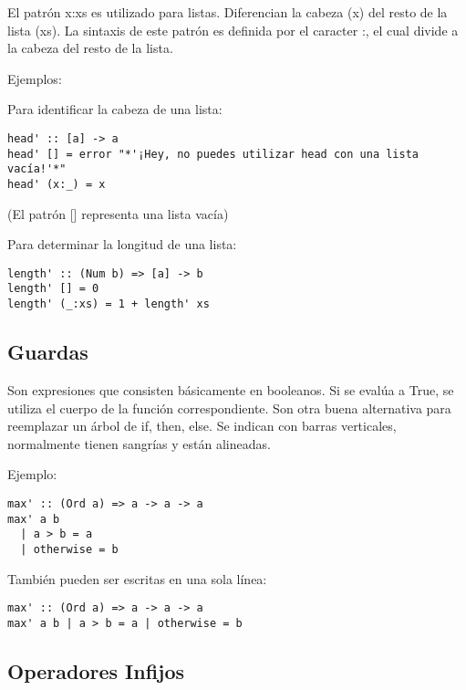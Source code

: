 El patrón x:xs es utilizado para listas. Diferencian la cabeza (x) del resto de la lista (xs). La sintaxis de este patrón es definida por el caracter :, el cual divide a la cabeza del resto de la lista.

Ejemplos:

Para identificar la cabeza de una lista:

\begin{lstlisting}
head' :: [a] -> a
head' [] = error "*'¡Hey, no puedes utilizar head con una lista vacía!'*"
head' (x:_) = x
\end{lstlisting}

(El patrón [] representa una lista vacía)

Para determinar la longitud de una lista:

\begin{lstlisting}
length' :: (Num b) => [a] -> b
length' [] = 0
length' (_:xs) = 1 + length' xs
\end{lstlisting}


\subsection{Guardas} %
\label{sub:guardas}

Son expresiones que consisten básicamente en booleanos. Si se evalúa a True, se utiliza el cuerpo de la función correspondiente. Son otra buena alternativa para reemplazar un árbol de if, then, else.
Se indican con barras verticales, normalmente tienen sangrías y están alineadas.

Ejemplo:

\begin{lstlisting}
max' :: (Ord a) => a -> a -> a
max' a b
  | a > b = a
  | otherwise = b
\end{lstlisting}

También pueden ser escritas en una sola línea:

\begin{lstlisting}
max' :: (Ord a) => a -> a -> a
max' a b | a > b = a | otherwise = b
\end{lstlisting}


\subsection{Operadores Infijos} %
\label{sub:operadores_infijos}

